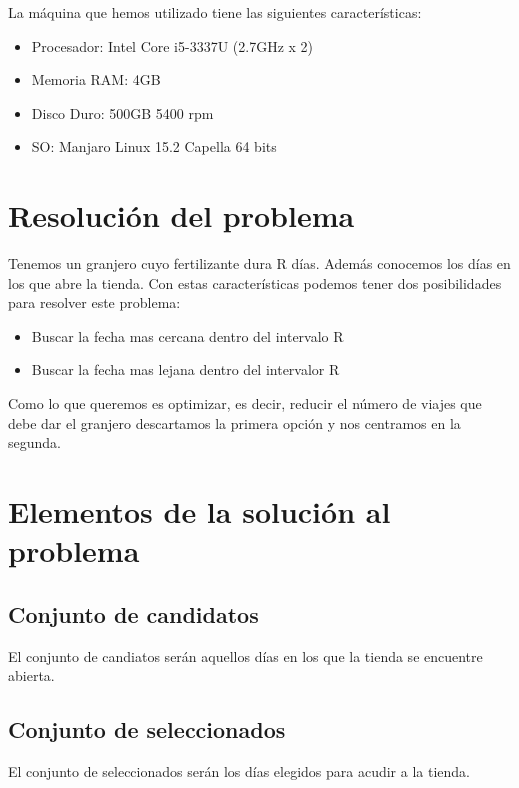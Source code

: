 La máquina que hemos utilizado tiene las siguientes características:
	
\begin{itemize}
		
	\item Procesador: Intel Core i5-3337U (2.7GHz x 2)
	\item Memoria RAM: 4GB
	\item Disco Duro: 500GB 5400 rpm
	\item SO: Manjaro Linux 15.2 Capella 64 bits
\end{itemize}
	

\section{Resolución del problema}

Tenemos un granjero cuyo fertilizante dura R días. Además conocemos los días en los que abre la tienda.
Con estas características podemos tener dos posibilidades para resolver este problema:
\begin{itemize}
	\item Buscar la fecha mas cercana dentro del intervalo R
	\item Buscar la fecha mas lejana dentro del intervalor R
\end{itemize}

Como lo que queremos es optimizar, es decir, reducir el número de viajes que debe dar el granjero descartamos la primera opción y nos centramos en la segunda.


\section{Elementos de la solución al problema}

\subsection{Conjunto de candidatos}
El conjunto de candiatos serán aquellos días en los que la tienda se encuentre abierta.

\subsection{Conjunto de seleccionados}
El conjunto de seleccionados serán los días elegidos para acudir a la tienda.

